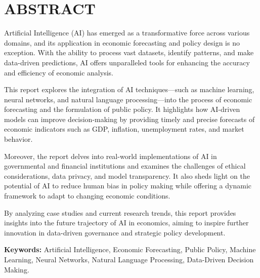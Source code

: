 \chapter*{ABSTRACT}
\justifying
{}

Artificial Intelligence (AI) has emerged as a transformative force across various domains, and its application in economic forecasting and policy design is no exception. With the ability to process vast datasets, identify patterns, and make data-driven predictions, AI offers unparalleled tools for enhancing the accuracy and efficiency of economic analysis.

This report explores the integration of AI techniques—such as machine learning, neural networks, and natural language processing—into the process of economic forecasting and the formulation of public policy. It highlights how AI-driven models can improve decision-making by providing timely and precise forecasts of economic indicators such as GDP, inflation, unemployment rates, and market behavior.

Moreover, the report delves into real-world implementations of AI in governmental and financial institutions and examines the challenges of ethical considerations, data privacy, and model transparency. It also sheds light on the potential of AI to reduce human bias in policy making while offering a dynamic framework to adapt to changing economic conditions.

By analyzing case studies and current research trends, this report provides insights into the future trajectory of AI in economics, aiming to inspire further innovation in data-driven governance and strategic policy development.

\vspace{1.5cm}
\textbf{Keywords:} Artificial Intelligence, Economic Forecasting, Public Policy, Machine Learning, Neural Networks, Natural Language Processing, Data-Driven Decision Making.